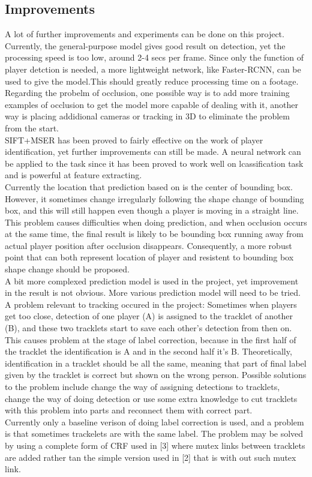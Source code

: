 \documentclass{article}
\begin{document}
\subsection{Improvements}
A lot of further improvements and experiments can be done on this project.\\
Currently, the general-purpose model gives good result on detection, yet the processing speed is too low, around 2-4 secs per frame. Since only the function of player detction is needed, a more lightweight network, like Faster-RCNN, can be used to give the model.This should greatly reduce processing time on a footage.\\
Regarding the probelm of occlusion, one possible way is to add more training examples of occlusion to get the model more capable of dealing with it, another way is placing addidional cameras or tracking in 3D to eliminate the problem from the start.\\
SIFT+MSER has been proved to fairly effective on the work of player identification, yet further improvements can still be made. A neural network can be applied to the task since it has been proved to work well on lcassification task and is powerful at feature extracting.\\
Currently the location that prediction based on is the center of bounding box. However, it sometimes change irregularly following the shape change of bounding box, and this will still happen even though a player is moving in a straight line. This problem causes difficulties when doing prediction, and when occlusion occurs at the same time, the final result is likely to be bounding box running away from actual player position after occlusion disappears. Consequently, a more robust point that can both represent location of player and resistent to bounding box shape change should be proposed.\\
A bit more complexed prediction model is used in the project, yet improvement in the result is not obvious. More various prediction model will need to be tried.\\
A problem relevant to tracking occured in the project: Sometimes when players get too close, detection of one player (A) is assigned to the tracklet of another (B), and these two tracklets start to save each other's detection from then on. This causes problem at the stage of label correction, because in the first half of the tracklet the identification is A and in the second half it's B. Theoretically, identification in a tracklet should be all the same, meaning that part of final label given by the tracklet is correct but shown on the wrong person. Possible solutions to the problem include change the way of assigning detections to tracklets, change the way of doing detection or use some extra knowledge to cut tracklets with this problem into parts and reconnect them with correct part.\\
Currently only a baseline verison of doing label correction is used, and a problem is that sometimes trackelets are with the same label. The problem may be solved by using a complete form of CRF used in [3] where mutex links between tracklets are added rather tan the simple version used in [2] that is with out such mutex link.
\end{document}
